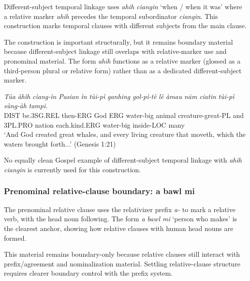 \documentclass[
  11pt,
  a4paper,
]{article}
\newcommand{\tdim}[1]{\textit{#1}}
\newcommand{\tdimword}[1]{\textit{#1}}
\renewcommand{\textsc}[1]{{\footnotesize\MakeUppercase{#1}}}
\newcommand{\glossquote}[1]{`#1'}
\begin{document}
Different-subject temporal linkage uses \tdim{ahih ciangin}
\glossquote{when / when it was} where a relative marker \tdim{ahih}
precedes the temporal subordinator \tdim{ciangin}. This construction
marks temporal clauses with different subjects from the main clause.

The construction is important structurally, but it remains boundary
material because different-subject linkage still overlaps with
relative-marker use and pronominal material. The form \tdim{ahih}
functions as a relative marker (glossed as a third-person plural or
relative form) rather than as a dedicated different-subject marker.

\begin{exe}
\ex \label{ex:clause-ahih-ciangin-gen1p21}
\gll \tdimword{Túa} \tdimword{àhìh} \tdimword{cìang-ìn} \tdimword{Pasian} \tdimword{ìn} \tdimword{tùi-pì} \tdimword{ganhing} \tdimword{gol-pì-tè} \tdimword{lè} \tdimword{àmau} \tdimword{nām} \tdimword{ciatin} \tdimword{tùi-pì} \tdimword{sùng-àh} \tdimword{tampi.} \\
     \textsc{dist} be.\textsc{3sg}.\textsc{rel} then-\textsc{erg} God \textsc{erg} water-big animal creature-great-\textsc{pl} and \textsc{3pl}.\textsc{pro} nation each.kind.\textsc{erg} water-big inside-\textsc{loc} many \\
\glt \glossquote{And God created great whales, and every living creature that moveth, which the waters brought forth...} (Genesis 1:21)
\end{exe}

No equally clean Gospel example of different-subject temporal linkage
with \tdim{ahih ciangin} is currently used for this construction.

\subsubsection{Prenominal relative-clause boundary: a bawl
mi}\label{prenominal-relative-clause-boundary-a-bawl-mi}

The prenominal relative clause uses the relativizer prefix \tdim{a-} to
mark a relative verb, with the head noun following. The form
\tdim{a bawl mi} \glossquote{person who makes} is the clearest anchor,
showing how relative clauses with human head nouns are formed.

This material remains boundary-only because relative clauses still
interact with prefix/agreement and nominalization material. Settling
relative-clause structure requires clearer boundary control with the
prefix system.
\end{document}
